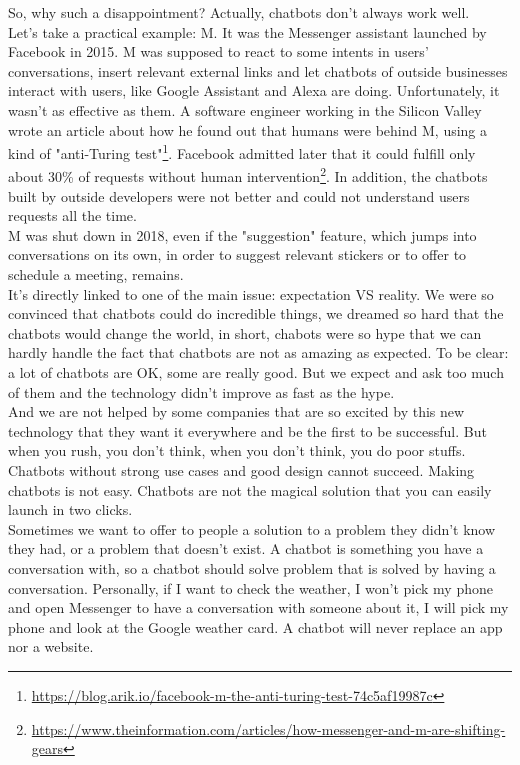 \documentclass{article}
\begin{document}
So, why such a disappointment? Actually, chatbots don’t always work well.\\
Let's take a practical example: M. It was the Messenger assistant launched by Facebook in 2015. M was supposed to react to some intents in users’ conversations, insert relevant external links and let chatbots of outside businesses interact with users, like Google Assistant and Alexa are doing. Unfortunately, it wasn't as effective as them. A software engineer working in the Silicon Valley wrote an article about how he found out that humans were behind M, using a kind of "anti-Turing test"\footnote{\url{https://blog.arik.io/facebook-m-the-anti-turing-test-74c5af19987c}}. Facebook admitted later that it could fulfill only about 30\% of requests without human intervention\footnote{\url{https://www.theinformation.com/articles/how-messenger-and-m-are-shifting-gears}}.  In addition, the chatbots built by outside developers were not better and could not understand users requests all the time.\\
M was shut down in 2018, even if the "suggestion" feature, which jumps into conversations on its own, in order to suggest relevant stickers or to offer to schedule a meeting, remains.\\
\break
It’s directly linked to one of the main issue: expectation VS reality. We were so convinced that chatbots could do incredible things, we dreamed so hard that the chatbots would change the world, in short, chabots were so hype that we can hardly handle the fact that chatbots are not as amazing as expected. To be clear: a lot of chatbots are OK, some are really good. But we expect and ask too much of them and the technology didn’t improve as fast as the hype.\\
\break
And we are not helped by some companies that are so excited by this new technology that they
want it everywhere and be the first to be successful. But when you rush, you don’t think, when you don’t think, you do poor stuffs. Chatbots without strong use cases and good design cannot succeed. Making chatbots is not easy. Chatbots are not the magical solution that you can easily launch in two clicks.\\
\break
Sometimes we want to offer to people a solution to a problem they didn’t know they had, or a problem that doesn’t exist. A chatbot is something you have a conversation with, so a chatbot should solve problem that is solved by having a conversation.
Personally, if I want to check the weather, I won’t pick my phone and open Messenger to have a conversation with someone about it, I will pick my phone and look at the Google weather card. A chatbot will never replace an app nor a website.\\
\end{document}
